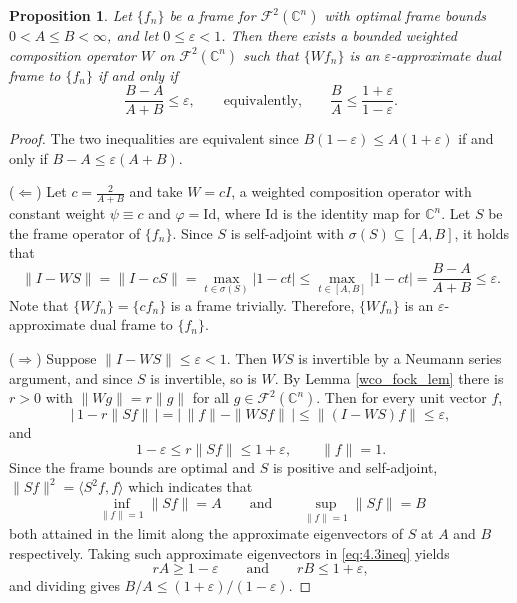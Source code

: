 \documentclass[10pt,a4paper]{amsart}
\newtheorem{prop}{Proposition}
\begin{document}
\begin{prop}\label{fock_main}
Let $\{f_n\}$ be a frame for $\mathcal{F}^2(\mathbb{C}^n)$ with optimal frame
bounds $0 < A \le B < \infty$, and let $0 \le \varepsilon < 1$. Then
there exists a bounded weighted composition operator $W$ on
$\mathcal{F}^2(\mathbb{C}^n)$ such that $\{Wf_n\}$ is an
$\varepsilon$-approximate dual frame to $\{f_n\}$ if and only if
\[
\frac{B - A}{A + B} \le \varepsilon,
\qquad\text{equivalently,}\qquad
\frac{B}{A} \le \frac{1 + \varepsilon}{1 - \varepsilon}.
\]
\end{prop}

\begin{proof}
The two inequalities are equivalent since
$B(1-\varepsilon) \le A(1+\varepsilon)$ if and only if
$B - A \le \varepsilon(A + B)$.

($\Leftarrow$) Let $c = \tfrac{2}{A+B}$ and take $W = cI$, a weighted
composition operator with constant weight $\psi \equiv c$ and
$\varphi = \mathrm{Id}$, where $\mathrm{Id}$ is the identity map for $\mathbb{C}^n$. Let $S$ be the frame operator of $\{f_n\}$.  Since $S$ is self-adjoint with
$\sigma(S) \subseteq [A, B]$, it holds that
\[
\|I - WS\| = \|I - cS\|
= \max_{t \in \sigma(S)} |1 - ct|
\le \max_{t \in [A,B]} |1 - ct|
= \frac{B-A}{A+B} \le \varepsilon.
\]
Note
that $\{Wf_n\} = \{cf_n\}$ is a frame trivially. Therefore, $\{Wf_n\}$ is an $\varepsilon$-approximate dual frame to $\{f_n\}$.

($\Rightarrow$) Suppose $\|I - WS\| \le \varepsilon < 1$. Then $WS$
is invertible by a Neumann series argument, and since $S$ is
invertible, so is $W$. By Lemma \ref{wco_fock_lem} there is
$r > 0$ with $\|Wg\| = r\|g\|$ for all $g \in \mathcal{F}^2(\mathbb{C}^n)$.
Then for every unit vector $f$,
\[
\bigl|\,1 - r\|Sf\|\,\bigr| = \bigl|\,\|f\| - \|WSf\|\,\bigr|
   \le \|(I-WS)f\| \le \varepsilon,
\]
and
\begin{equation}\label{eq:4.3ineq}
1 - \varepsilon \le r\|Sf\| \le 1 + \varepsilon,
\qquad \|f\| = 1.
\end{equation}
Since the frame bounds are optimal and $S$ is positive and self-adjoint,
$\|Sf\|^2 = \langle S^2 f, f\rangle$ which indicates that
\[
\inf_{\|f\|=1} \|Sf\| = A
\qquad\text{and}\qquad
\sup_{\|f\|=1} \|Sf\| = B
\]
both attained in the limit along the approximate eigenvectors of $S$ at
$A$ and $B$ respectively. Taking such approximate eigenvectors in
\eqref{eq:4.3ineq} yields
\[
rA \ge 1 - \varepsilon
\qquad\text{and}\qquad
rB \le 1 + \varepsilon,
\]
and dividing gives $B/A \le (1+\varepsilon)/(1-\varepsilon)$.
\end{proof}
\end{document}
